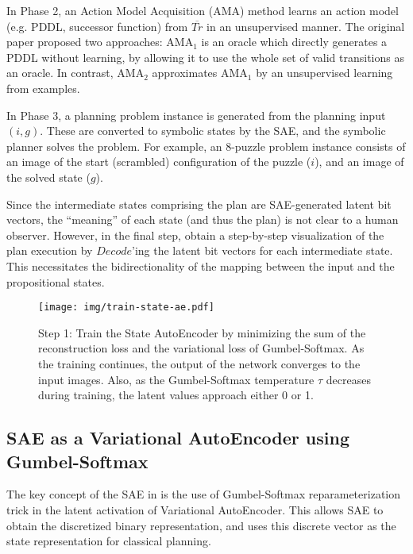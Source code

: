 In Phase 2, an Action Model Acquisition (AMA) method learns an action model (e.g. PDDL, successor function) from $\overline{Tr}$ in an unsupervised manner.
The original paper proposed two approaches: AMA$_1$ is an oracle which directly generates a PDDL without learning,
by allowing it to use the whole set of valid transitions as an oracle.
In contrast, AMA$_2$ approximates AMA$_1$ by an unsupervised learning from examples.

In Phase 3, a planning problem instance is generated from the planning input $(i,g)$.
These are converted to symbolic states by the SAE, and the symbolic planner solves the problem.
For example, an 8-puzzle problem instance consists of an image of the start (scrambled) configuration of the puzzle ($i$), and an image of the solved state ($g$).

Since the intermediate states comprising the plan are SAE-generated latent bit vectors, the ``meaning'' of each state (and thus the plan) is not clear to a human observer.
However, in the final step, \latentplanner obtain a step-by-step visualization of the plan execution
by $Decode$'ing the latent bit vectors for each intermediate state.
This necessitates the bidirectionality of the mapping between the input and the propositional states.

\begin{figure}[htb]
 \texttt{[image: img/train-state-ae.pdf]}
 \caption{Step 1:
Train the State AutoEncoder by
 minimizing the sum of the reconstruction loss and the variational loss of Gumbel-Softmax.
As the training continues, the output of the network converges to the input images.
Also, as the Gumbel-Softmax temperature $\tau$ decreases during training,
the latent values approach either 0 or 1.}
 \label{sae}
\end{figure}

\subsection{SAE as a Variational AutoEncoder using Gumbel-Softmax}

The key concept of the SAE in \latentplanner is the use of Gumbel-Softmax \cite{jang2016categorical}
reparameterization trick in the latent activation of Variational AutoEncoder.
This allows SAE to obtain the
discretized binary representation, and \latentplanner uses this
discrete vector as the state representation for classical planning.

